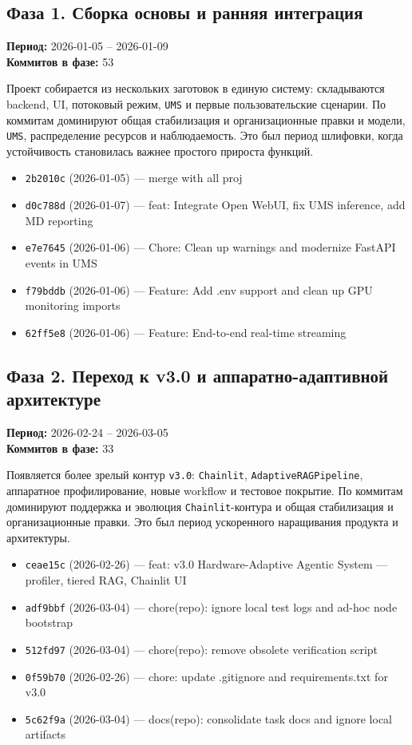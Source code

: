 \subsection*{Фаза 1. Сборка основы и ранняя интеграция}
\textbf{Период:} 2026-01-05 -- 2026-01-09 \\
\textbf{Коммитов в фазе:} 53

Проект собирается из нескольких заготовок в единую систему: складываются backend, UI, потоковый режим, \texttt{UMS} и первые пользовательские сценарии. По коммитам доминируют общая стабилизация и организационные правки и модели, \texttt{UMS}, распределение ресурсов и наблюдаемость. Это был период шлифовки, когда устойчивость становилась важнее простого прироста функций.

\begin{itemize}
\item \texttt{2b2010c} (2026-01-05) --- merge with all proj
\item \texttt{d0c788d} (2026-01-07) --- feat: Integrate Open WebUI, fix UMS inference, add MD reporting
\item \texttt{e7e7645} (2026-01-06) --- Chore: Clean up warnings and modernize FastAPI events in UMS
\item \texttt{f79bddb} (2026-01-06) --- Feature: Add .env support and clean up GPU monitoring imports
\item \texttt{62ff5e8} (2026-01-06) --- Feature: End-to-end real-time streaming
\end{itemize}

\subsection*{Фаза 2. Переход к v3.0 и аппаратно-адаптивной архитектуре}
\textbf{Период:} 2026-02-24 -- 2026-03-05 \\
\textbf{Коммитов в фазе:} 33

Появляется более зрелый контур \texttt{v3.0}: \texttt{Chainlit}, \texttt{AdaptiveRAGPipeline}, аппаратное профилирование, новые workflow и тестовое покрытие. По коммитам доминируют поддержка и эволюция \texttt{Chainlit}-контура и общая стабилизация и организационные правки. Это был период ускоренного наращивания продукта и архитектуры.

\begin{itemize}
\item \texttt{ceae15c} (2026-02-26) --- feat: v3.0 Hardware-Adaptive Agentic System — profiler, tiered RAG, Chainlit UI
\item \texttt{adf9bbf} (2026-03-04) --- chore(repo): ignore local test logs and ad-hoc node bootstrap
\item \texttt{512fd97} (2026-03-04) --- chore(repo): remove obsolete verification script
\item \texttt{0f59b70} (2026-02-26) --- chore: update .gitignore and requirements.txt for v3.0
\item \texttt{5c62f9a} (2026-03-04) --- docs(repo): consolidate task docs and ignore local artifacts
\end{itemize}

